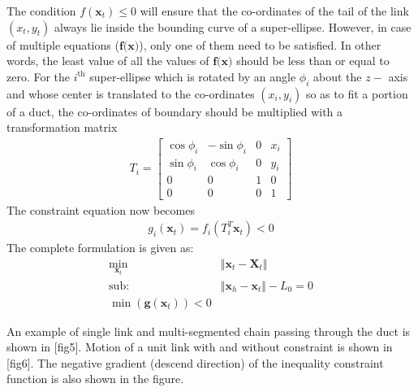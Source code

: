 \documentclass[11pt,a4paper]{article}
\begin{document}
The condition $f(\textbf{x}_t)\leq0$ will ensure that the co-ordinates of the tail of the link $(x_t,y_t)$ always lie inside the bounding curve of a super-ellipse. However, in case of multiple equations ($\textbf{f(x)}$), only one of them need to be satisfied. In other words, the least value of all the values of $\textbf{f(x)}$ should be less than or equal to zero. For the $i^\text{th}$ super-ellipse which is rotated by an angle $\phi_i$ about the $z-$ axis and whose center is translated to the co-ordinates $(x_i,y_i)$ so as to fit a portion of a duct, the co-ordinates of boundary should be multiplied with a transformation matrix
\begin{align}
T_i = \begin{bmatrix}
\cos \phi_i & -\sin\phi_i & 0 & x_i\\
\sin \phi_i & \cos\phi_i & 0 & y_i\\
0 & 0 & 1 &0\\
0 & 0 & 0 & 1
\end{bmatrix}
\end{align}
The constraint equation now becomes 
\begin{align}
g_i(\textbf{x}_t) = f_i(T_i^T\textbf{x}_t)< 0
\end{align}
The complete formulation is given as:
\begin{align}
\label{eq: min,mingx}
\min_{\textbf{x}_t} &\Vert \textbf{x}_t-\textbf{X}_t \Vert\\
\text{sub:~~~} &\Vert \textbf{x}_h - \textbf{x}_t \Vert -L_0 = 0\\
\min\left(\textbf{g}(\textbf{x}_t)\right) < 0
\end{align}

An example of single link and multi-segmented chain passing through the duct is shown in [fig5]. Motion of a unit link with and without constraint is shown in [fig6]. The negative gradient (descend direction) of the inequality constraint function is also shown in the figure.
\end{document}
